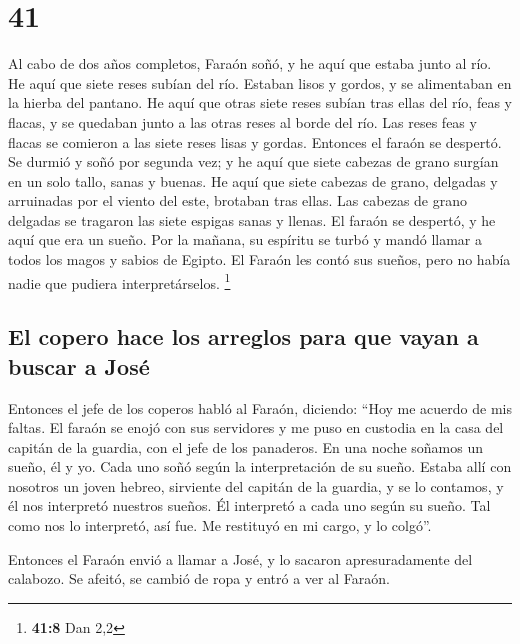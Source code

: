 \hypertarget{section-40}{%
\section{41}\label{section-40}}

 Al cabo de dos años completos, Faraón soñó, y he aquí que
estaba junto al río.  He aquí que siete reses subían del
río. Estaban lisos y gordos, y se alimentaban en la hierba del pantano.
 He aquí que otras siete reses subían tras ellas del río,
feas y flacas, y se quedaban junto a las otras reses al borde del río.
 Las reses feas y flacas se comieron a las siete reses
lisas y gordas. Entonces el faraón se despertó.  Se durmió
y soñó por segunda vez; y he aquí que siete cabezas de grano surgían en
un solo tallo, sanas y buenas.  He aquí que siete cabezas
de grano, delgadas y arruinadas por el viento del este, brotaban tras
ellas.  Las cabezas de grano delgadas se tragaron las
siete espigas sanas y llenas. El faraón se despertó, y he aquí que era
un sueño.  Por la mañana, su espíritu se turbó y mandó
llamar a todos los magos y sabios de Egipto. El Faraón les contó sus
sueños, pero no había nadie que pudiera interpretárselos. \footnote{\textbf{41:8}
  Dan 2,2}

\hypertarget{el-copero-hace-los-arreglos-para-que-vayan-a-buscar-a-josuxe9}{%
\subsection{El copero hace los arreglos para que vayan a buscar a
José}\label{el-copero-hace-los-arreglos-para-que-vayan-a-buscar-a-josuxe9}}

 Entonces el jefe de los coperos habló al Faraón,
diciendo: ``Hoy me acuerdo de mis faltas.  El faraón se
enojó con sus servidores y me puso en custodia en la casa del capitán de
la guardia, con el jefe de los panaderos.  En una noche
soñamos un sueño, él y yo. Cada uno soñó según la interpretación de su
sueño.  Estaba allí con nosotros un joven hebreo,
sirviente del capitán de la guardia, y se lo contamos, y él nos
interpretó nuestros sueños. Él interpretó a cada uno según su sueño.
 Tal como nos lo interpretó, así fue. Me restituyó en mi
cargo, y lo colgó''.

 Entonces el Faraón envió a llamar a José, y lo sacaron
apresuradamente del calabozo. Se afeitó, se cambió de ropa y entró a ver
al Faraón.


